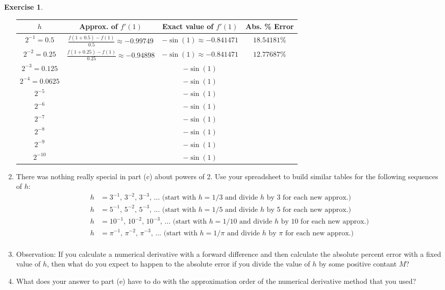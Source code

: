 \documentclass[
]{book}
\theoremstyle{definition}
\theoremstyle{definition}
\theoremstyle{definition}
\newtheorem{exercise}{Exercise}[chapter]
\theoremstyle{remark}
\begin{document}
\begin{exercise}
\begin{enumerate}
  \begin{longtable}[]{@{}cccc@{}}
  \toprule
  \(h\) & Approx. of \(f'(1)\) & Exact value of \(f'(1)\) & Abs. \% Error\tabularnewline
  \midrule
  \endhead
  \(2^{-1} = 0.5\) & \(\frac{f(1+0.5)-f(1)}{0.5} \approx -0.99749\) & \(-\sin(1) \approx -0.841471\) & \(18.54181\%\)\tabularnewline
  \(2^{-2} = 0.25\) & \(\frac{f(1+0.25)-f(1)}{0.25} \approx -0.94898\) & \(-\sin(1) \approx -0.841471\) & \(12.77687\%\)\tabularnewline
  \(2^{-3} = 0.125\) & & \(-\sin(1)\) &\tabularnewline
  \(2^{-4}=0.0625\) & & \(-\sin(1)\) &\tabularnewline
  \(2^{-5}\) & & \(-\sin(1)\) &\tabularnewline
  \(2^{-6}\) & & \(-\sin(1)\) &\tabularnewline
  \(2^{-7}\) & & \(-\sin(1)\) &\tabularnewline
  \(2^{-8}\) & & \(-\sin(1)\) &\tabularnewline
  \(2^{-9}\) & & \(-\sin(1)\) &\tabularnewline
  \(2^{-10}\) & & \(-\sin(1)\) &\tabularnewline
  \bottomrule
  \end{longtable}
\item
  There was nothing really special in part (c) about powers of 2. Use
  your spreadsheet to build similar tables for the following sequences
  of \(h\): \[\begin{aligned}
             h &= 3^{-1}, \, 3^{-2}, \, 3^{-3}, \, \ldots \text{ (start with $h=1/3$ and divide $h$ by 3 for each new approx.)}  \\
             h &= 5^{-1}, \, 5^{-2}, \, 5^{-3}, \, \ldots \text{ (start with $h=1/5$ and divide $h$ by 5 for each new approx.)} \\
             h &= 10^{-1}, \, 10^{-2}, \, 10^{-3}, \, \ldots \text{ (start with $h=1/10$ and divide $h$ by 10 for each new approx.)} \\
             h &= \pi^{-1}, \, \pi^{-2}, \, \pi^{-3}, \, \ldots \text{ (start with $h=1/\pi$ and divide $h$ by $\pi$ for each new approx.)} \\
          \end{aligned}\]
\item
  Observation: If you calculate a numerical derivative with a forward
  difference and then calculate the absolute percent error with a
  fixed value of \(h\), then what do you expect to happen to the
  absolute error if you divide the value of \(h\) by some positive
  contant \(M\)?
\item
  What does your answer to part (e) have to do with the approximation
  order of the numerical derivative method that you used?
\end{enumerate}
\end{exercise}
\end{document}
